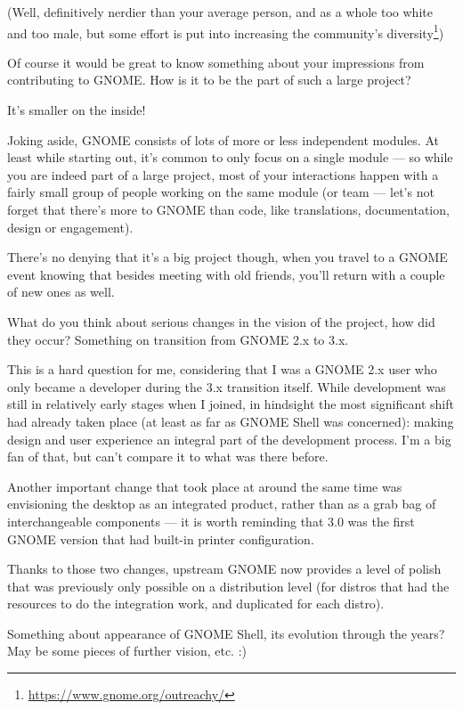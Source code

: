 \documentclass[10pt, a5paper]{article}
\begin{document}
\begin{Parallel}[p]{}{}
{(Well, definitively nerdier than your average person, and as a whole too white and too male, but some effort is put into increasing the community's diversity\footnote{\url{https://www.gnome.org/outreachy/}})


\q Of course it would be great to know something about your impressions from
contributing to GNOME. How is it to be the part of such a large project?

\a It's smaller on the inside!

Joking aside, GNOME consists of lots of more or less independent modules. At least while starting out, it's common to only focus on a single module — so while you are indeed part of a large project, most of your interactions happen with a fairly small group of people working on the same module (or team — let's not forget that there's more to GNOME than code, like translations, documentation, design or engagement).

There's no denying that it's a big project though, when you travel to a GNOME event knowing that besides meeting with old friends, you'll return with a couple of new ones as well.


\q What do you think about serious changes in the vision of the project,
how did they occur? Something on transition from GNOME 2.x to 3.x. 

\a This is a hard question for me, considering that I was a GNOME 2.x user who only became a developer during the 3.x transition itself. While development was still in relatively early stages when I joined, in hindsight the most significant shift had already taken place (at least as far as GNOME Shell was concerned): making design and user experience an integral part of the development process. I'm a big fan of that, but can't compare it to what was there before.

Another important change that took place at around the same time was envisioning the desktop as an integrated product, rather than as a grab bag of interchangeable components — it is worth reminding that 3.0 was the first GNOME version that had built-in printer configuration.

Thanks to those two changes, upstream GNOME now provides a level of polish that was previously only possible on a distribution level (for distros that had the resources to do the integration work, and duplicated for each distro).

\q Something about appearance of GNOME Shell, its evolution through the years? May be some pieces of further vision, etc. :)

}
\end{Parallel}
\end{document}

